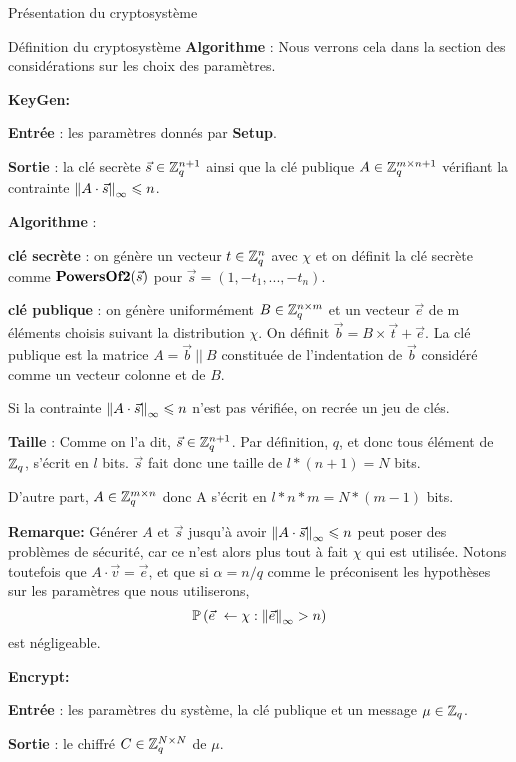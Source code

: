 \begin{section}{Présentation du cryptosystème}
\begin{subsection}{Définition du cryptosystème}
	\textbf{Algorithme} : Nous verrons cela dans la section des considérations sur les choix des paramètres.
	
\vspace{0.5cm}\noindent\textbf{KeyGen:}
\flushleft
	
	\textbf{Entrée} : les paramètres donnés par \textbf{Setup}.

	\textbf{Sortie} : la clé secrète $\vec{s} \in
	\mathbb{Z}_q^{n+1}$ ainsi que la clé publique $A \in \mathbb{Z}_q^{m \times n+1}$ vérifiant la contrainte 
	${\|A \cdot \vec{s}\|}_{\infty} \leqslant n$.

	\textbf{Algorithme} :

	\textbf{clé secrète} : on génère un vecteur $t \in \mathbb{Z}_q^n$ avec $\chi$ et on définit la clé secrète comme $\text{\textbf{PowersOf2}}(\vec{s})$ pour $\vec{s} = (1, -t_1, ..., -t_n)$.

	\textbf{clé publique} : on génère uniformément $B \in \mathbb{Z}_q^{n \times m}$ et un vecteur $\vec{e}$ de m
	éléments choisis suivant la distribution $\chi$. On définit $\vec{b} = B \times \vec{t} + \vec{e}$.  La clé
	publique est la matrice $A = \vec{b}\: || \:B$ constituée de l'indentation de $\vec{b}$ considéré comme un
	vecteur colonne et de $B$.

	Si la contrainte ${\|A \cdot \vec{s}\|}_{\infty} \leqslant n$ n'est pas vérifiée, on recrée un jeu de clés.

	\textbf{Taille} : Comme on l'a dit, $\vec{s} \in \mathbb{Z}_q^{n+1}$. Par définition, $q$, et donc tous élément de $\mathbb{Z}_q$, s'écrit en $l$ bits. $\vec{s}$ fait donc une taille de $l * (n+1) = N$ bits.

	D'autre part, $A \in \mathbb{Z}_q^{m \times n}$ donc A s'écrit en $l * n * m =	N * (m - 1)$ bits.

	\textbf{Remarque:} Générer $A$ et $\vec{s}$ jusqu'à avoir ${\|A \cdot \vec{s}\|}_{\infty} \leqslant n$ peut poser des problèmes de sécurité, car ce n'est alors plus tout à fait $\chi$ qui est utilisée. Notons toutefois que $A \cdot \vec{v} = \vec{e}$, et que si $\alpha = n/q$ comme le préconisent les hypothèses sur les paramètres que nous utiliserons,
	\[ \PP\left(\vec{e} \leftarrow \chi: \norm{\vec{e}} > n\right) \]
	est négligeable.

\vspace{0.5cm}\noindent\textbf{Encrypt:}
\flushleft
	
	\textbf{Entrée} : les paramètres du système, la clé publique et un message $\mu \in \mathbb{Z}_q$.

	\textbf{Sortie} : le chiffré $C \in \mathbb{Z}_q^{N \times N}$ de $\mu$.


\end{subsection}
\end{section}
